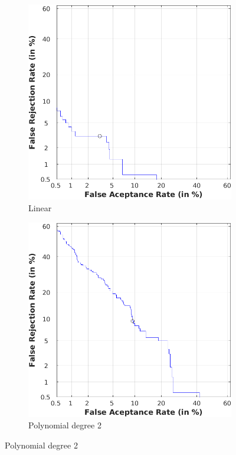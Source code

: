 \documentclass[11pt]{article}
\begin{document}
\begin{figure}[h!]
  \centering
       \begin{subfigure}[t]{0.4\textwidth}
         \centering
         \includegraphics[scale=0.45]{img/3a_linear_det}
         \caption{Linear}
     \end{subfigure}%
     \quad\quad
     \begin{subfigure}[t]{0.4\textwidth}
         \centering
         \includegraphics[scale=0.45]{img/3a_poly2_det}
         \caption{Polynomial degree 2}
     \end{subfigure}


\end{figure}
\end{document}
